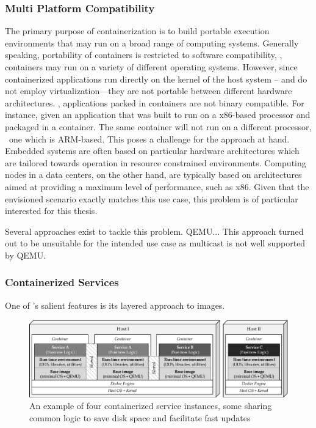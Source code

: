 \subsubsection{Multi Platform Compatibility} 
The primary purpose of containerization is to build portable execution environments that may run on a broad range of computing systems. Generally speaking, portability of containers is restricted to software compatibility, \ie , containers may run on a variety of different operating systems. However, since containerized applications run directly on the kernel of the host system -- and do not employ virtualization---they are not portable between different hardware architectures. \Ie , applications packed in containers are not binary compatible. For instance, given an application that was built to run on a x86-based processor and packaged in a container. The same container will not run on a different processor, \eg\ one which is ARM-based. This poses a challenge for the approach at hand. Embedded systems are often based on particular hardware architectures which are tailored towards operation in resource constrained environments. Computing nodes in a data centers, on the other hand, are typically based on architectures aimed at providing a maximum level of performance, such as x86. Given that the envisioned scenario exactly matches this use case, this problem is of particular interested for this thesis.

Several approaches exist to tackle this problem. QEMU... This approach turned out to be unsuitable for the intended use case as multicast is not well supported by QEMU.


\subsubsection{Containerized Services}
One of \docker 's salient features is its layered approach to images.

\begin{figure}[htpb]
  \centering
  \includegraphics[width=\textwidth]{figures/docker-sharing}
  \caption[An example of containerized services]{An example of four containerized service instances, some sharing common logic to save disk space and facilitate fast updates}\label{fig:service-containers} 
\end{figure}

